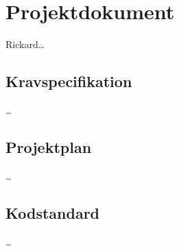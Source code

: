 \section{Projektdokument}
Rickard\ldots
\subsection{Kravspecifikation}
\ldots
\subsection{Projektplan}
\ldots
\subsection{Kodstandard}
\ldots
